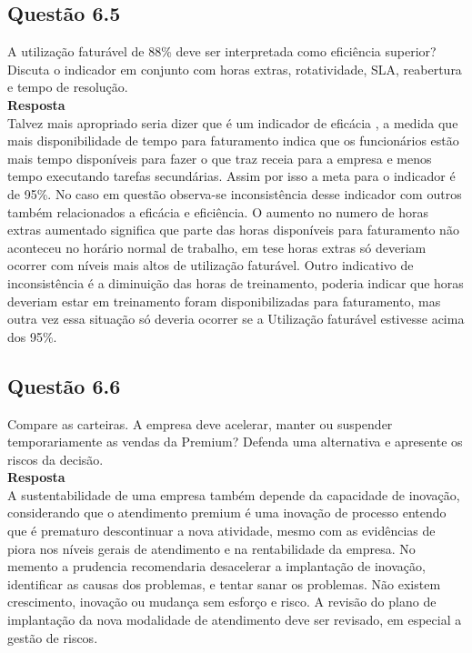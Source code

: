 \subsection{Questão 6.5}
  A utilização faturável de 88\% deve ser interpretada como eficiência superior? Discuta o indicador em conjunto com horas extras, rotatividade, SLA, reabertura e tempo de resolução.\\
 \textbf{Resposta}\\
  Talvez mais apropriado seria dizer que é um indicador de eficácia , a medida que mais disponibilidade de tempo para faturamento indica que os funcionários estão mais tempo disponíveis para fazer o que traz receia para a empresa e menos tempo executando tarefas secundárias. Assim por isso a meta para o indicador é de 95\%. No caso em questão observa-se inconsistência desse indicador com outros também relacionados a eficácia e eficiência. O aumento no numero de horas extras aumentado significa que parte das horas disponíveis para faturamento não aconteceu no horário normal de trabalho, em tese horas extras só deveriam ocorrer com níveis mais altos de utilização faturável. Outro indicativo de inconsistência é a diminuição das horas de treinamento, poderia indicar que horas deveriam estar em treinamento foram disponibilizadas para faturamento, mas outra vez essa situação só deveria ocorrer se a Utilização faturável estivesse acima dos 95\%.
\subsection{Questão 6.6}
Compare as carteiras. A empresa deve acelerar, manter ou suspender temporariamente as vendas da Premium? Defenda uma alternativa e apresente os riscos da decisão.\\
\textbf{Resposta}\\
A sustentabilidade de uma empresa também depende da capacidade de inovação, considerando que o atendimento premium é uma inovação de processo entendo que é prematuro descontinuar a nova atividade, mesmo com as evidências de piora nos níveis gerais de atendimento e na rentabilidade da empresa. No memento a prudencia recomendaria desacelerar a implantação de inovação, identificar as causas dos problemas, e tentar sanar os problemas. Não existem crescimento, inovação ou mudança sem esforço e risco. A revisão do plano de implantação da nova modalidade de atendimento deve ser revisado, em especial a gestão de riscos.\\
